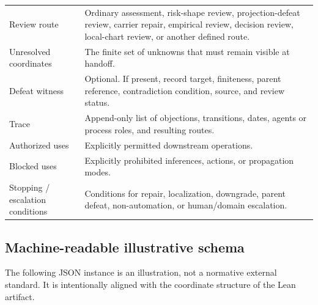 \documentclass[10pt]{article}
\begin{document}
\begin{longtable}{@{}p{}p{}@{}}
Review route & Ordinary assessment, risk-shape review, projection-defeat review, carrier repair, empirical review, decision review, local-chart review, or another defined route. \\
Unresolved coordinates & The finite set of unknowns that must remain visible at handoff. \\
Defeat witness & Optional. If present, record target, finiteness, parent reference, contradiction condition, source, and review status. \\
Trace & Append-only list of objections, transitions, dates, agents or process roles, and resulting routes. \\
Authorized uses & Explicitly permitted downstream operations. \\
Blocked uses & Explicitly prohibited inferences, actions, or propagation modes. \\
Stopping / escalation conditions & Conditions for repair, localization, downgrade, parent defeat, non-automation, or human/domain escalation. \\
\end{longtable}

\subsection{Machine-readable illustrative schema}

The following JSON instance is an illustration, not a normative external standard. It is intentionally aligned with the coordinate structure of the Lean artifact.
\end{document}
